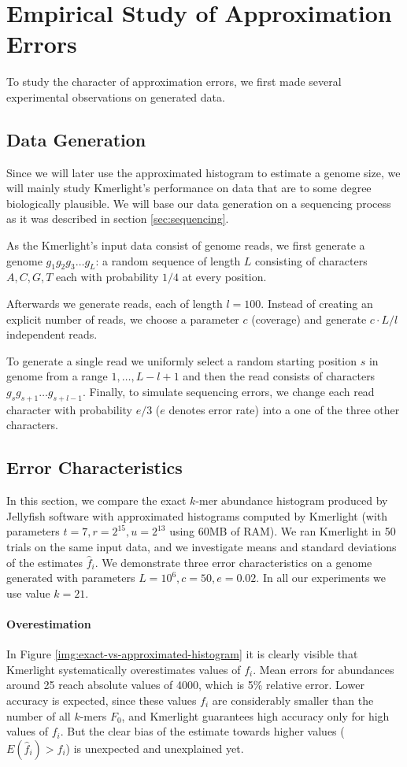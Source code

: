 \section{Empirical Study of Approximation Errors}
To study the character of approximation errors, we first made several experimental
observations on generated data.

\subsection{Data Generation}
\label{sec:data-generation}
Since we will later use the approximated histogram to estimate a genome size, 
we will mainly study Kmerlight's performance on data that are to some
degree biologically plausible. We will base our data generation on a sequencing
process as it was described in section \ref{sec:sequencing}.

As the Kmerlight's input data consist of genome reads, we first generate a genome 
$g_1g_2g_3 \dots g_L$: a random sequence of length $L$ consisting of characters $A, C, G, T$ 
each with probability $1/4$ at every position.

Afterwards we generate reads, each of length $l=100$. Instead of creating an explicit number
of reads, we choose a parameter $c$ (coverage) and generate $c \cdot L / l$ independent reads.

To generate a single read we uniformly select a random starting position $s$ in genome from
a range $1, \dots, L - l + 1$ and then the read consists of characters
$g_s g_{s+1} \dots g_{s+l-1}$. Finally, to simulate sequencing errors, we change each read
character with probability $e/3$ ($e$ denotes error rate) into a one of the three other characters.


\subsection{Error Characteristics}
\label{sec:error-characteristics}
In this section, we compare the exact $k$-mer abundance histogram produced by Jellyfish software
\cite{Marcais2011}
with approximated histograms computed by Kmerlight (with parameters $t=7, r=2^{15}, u=2^{13}$ using
60MB of RAM). We ran Kmerlight in 50 trials on the same input data, and we investigate means and
standard deviations of the estimates $\hat f_i$. We demonstrate three error characteristics
on a genome generated with parameters $L=10^6, c=50, e=0.02$. In all our experiments we
use value $k=21$.

\paragraph{Overestimation}
In Figure \ref{img:exact-vs-approximated-histogram} it is clearly visible that Kmerlight
systematically overestimates values of $f_i$. Mean errors for abundances around 25 reach
absolute values of 4000, which is 5\% relative error. Lower accuracy is expected, since these values
$f_i$ are considerably smaller than the number of all $k$-mers $F_0$, and Kmerlight guarantees
high accuracy only for high values of $f_i$. But the clear bias of the estimate towards higher
values ($E(\hat f_i) > f_i$) is unexpected and unexplained yet.  

